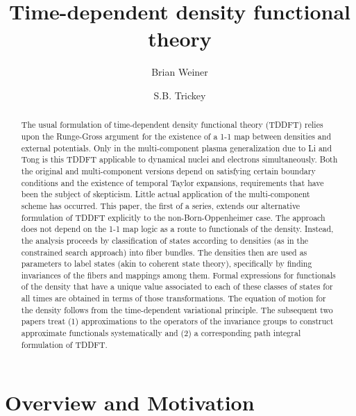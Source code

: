 \documentclass[aps,preprint]{revtex4}%
\begin{document}
\preprint{}
\title[TDDFT]{Time-dependent density functional theory}
\author{Brian Weiner}
\author{S.B. Trickey}


\begin{abstract}
The usual formulation of time-dependent density functional theory
(TDDFT) relies upon the Runge-Gross argument for the existence of a
1-1 map between densities and external potentials. Only in the
multi-component plasma generalization due to Li and Tong is this
TDDFT applicable to dynamical nuclei and electrons simultaneously.
Both the original and multi-component versions depend on satisfying
certain boundary conditions and the existence of temporal Taylor
expansions, requirements that have been the subject of skepticism.
Little actual application of the multi-component scheme has
occurred. This paper, the first of a series, extends our alternative
formulation of TDDFT explicitly to the non-Born-Oppenheimer case.
The approach does not depend on the 1-1 map logic as a route to
functionals of the density. Instead, the analysis proceeds by
classification of states according to densities (as in the
constrained search approach) into fiber bundles. The densities then
are used as parameters to label states (akin to coherent state
theory), specifically by finding invariances of the fibers and
mappings among them. Formal expressions for functionals of the
density that have a unique value associated to each of these classes
of states for all times are obtained in terms of those
transformations. The equation of motion for the density follows from
the time-dependent variational principle. The subsequent two papers
treat (1) approximations to the operators of the invariance groups
to construct approximate functionals systematically and (2) a
corresponding path integral formulation of TDDFT.

\end{abstract}

\maketitle
\tableofcontents


\section{Overview and Motivation}
\end{document}
